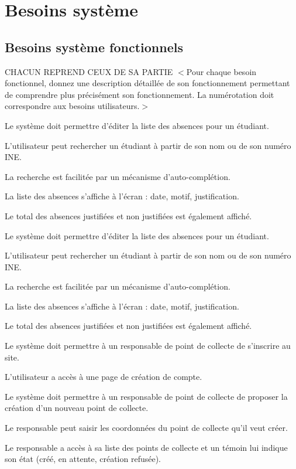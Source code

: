 \chapter{Besoins système}

\section{Besoins système fonctionnels}
CHACUN REPREND CEUX DE SA PARTIE
$<$Pour chaque besoin fonctionnel, donnez une description détaillée de son fonctionnement permettant de comprendre plus précisément son fonctionnement. La numérotation doit correspondre aux besoins utilisateurs.$>$


\begin{reqf}{Le système doit permettre d'éditer la liste des absences pour un étudiant.}
\item L'utilisateur peut rechercher un étudiant à partir de son nom ou de son numéro INE. 
\item La recherche est facilitée par un mécanisme d'auto-complétion. 
\item La liste des absences s'affiche à l'écran : date, motif, justification.
\item Le total des absences justifiées et non justifiées est également affiché.
\end{reqf}


\begin{reqf}{Le système doit permettre d'éditer la liste des absences pour un étudiant.}
\item L'utilisateur peut rechercher un étudiant à partir de son nom ou de son numéro INE. 
\item La recherche est facilitée par un mécanisme d'auto-complétion. 
\item La liste des absences s'affiche à l'écran : date, motif, justification.
\item Le total des absences justifiées et non justifiées est également affiché.
\end{reqf}

\begin{reqf}{Le système doit permettre à un responsable de point de collecte de s'inscrire au site.}
\item L'utilisateur a accès à une page de création de compte.
\end{reqf}

\begin{reqf}{Le système doit permettre à un responsable de point de collecte de proposer la création d'un nouveau point de collecte.}
\item Le responsable peut saisir les coordonnées du point de collecte qu'il veut créer.
\item Le responsable a accès à sa liste des points de collecte et un témoin lui indique son état (créé, en attente, création refusée).
\end{reqf}

